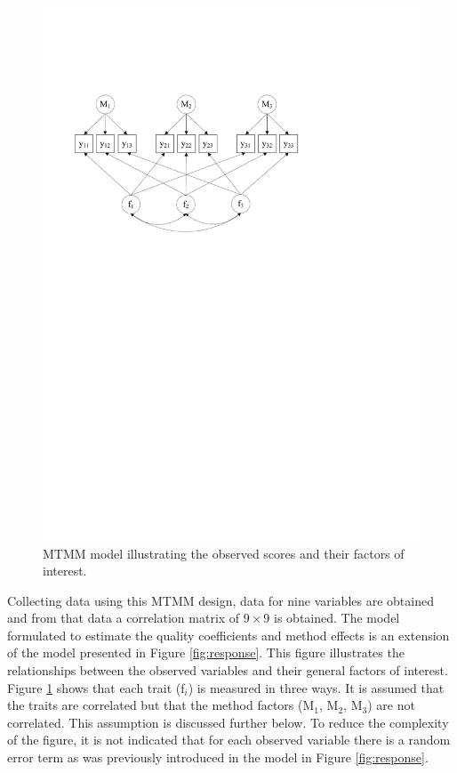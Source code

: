 \documentclass[a4paper,12pt]{article}
\begin{document}
\begin{figure}[htb]\centering
\includegraphics[width=.7\textwidth]{MTMM}
\caption{\label{fig:mtmm}MTMM model illustrating the observed scores and their factors of interest.}
\end{figure}

Collecting data using this MTMM design, data for nine variables are obtained and from that data a correlation matrix of $9 \times 9$ is obtained. The model formulated to estimate the quality coefficients and method effects is an extension of the model presented in Figure \ref{fig:response}. This figure illustrates the relationships between the observed variables and their general factors of interest. Figure \ref{fig:mtmm} shows that each trait (f$_i$) is measured in three ways. It is assumed that the traits are correlated but that the method factors (M$_1$, M$_2$, M$_3$) are not correlated. This assumption is discussed further below. To reduce the complexity of the figure, it is not indicated that for each observed variable there is a random error term as was previously introduced in the model in Figure \ref{fig:response}. 
\end{document}
